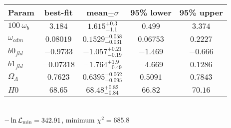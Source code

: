 \begin{tabular}{|l|c|c|c|c|} 
 \hline 
Param & best-fit & mean$\pm\sigma$ & 95\% lower & 95\% upper \\ \hline 
$100~\omega_{b }$ &$3.184$ & $1.615_{-1.1}^{+0.3}$ & $0.499$ & $3.374$ \\ 
$\omega_{cdm }$ &$0.08019$ & $0.1529_{-0.031}^{+0.058}$ & $0.06753$ & $0.2227$ \\ 
$b0_{fld }$ &$-0.9733$ & $-1.057_{-0.19}^{+0.21}$ & $-1.469$ & $-0.666$ \\ 
$b1_{fld }$ &$-0.07318$ & $-1.764_{-0.49}^{+1.9}$ & $-4.669$ & $0.1286$ \\ 
$\Omega_{\Lambda }$ &$0.7623$ & $0.6395_{-0.095}^{+0.062}$ & $0.5091$ & $0.7843$ \\ 
$H0$ &$68.65$ & $68.48_{-0.84}^{+0.82}$ & $66.82$ & $70.16$ \\ 
\hline 
 \end{tabular} \\ 
$-\ln{\cal L}_\mathrm{min} =342.91$, minimum $\chi^2=685.8$ \\ 
